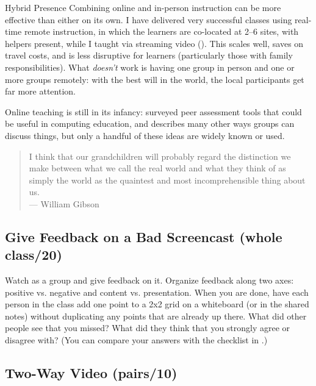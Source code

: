\begin{aside}{Hybrid Presence}
  Combining online and in-person instruction can be more effective than
  either on its own. I have delivered very successful classes using
  real-time remote instruction, in which the learners are co-located at
  2--6 sites, with helpers present, while I taught via streaming video
  (). This scales well, saves on travel
  costs, and is less disruptive for learners (particularly those with
  family responsibilities). What \emph{doesn't} work is having one group in
  person and one or more groups remotely: with the best will in the
  world, the local participants get far more attention.
\end{aside}

Online teaching is still in its infancy: \cite{Luxt2009} surveyed
peer assessment tools that could be useful in computing education, and
\cite{Broo2016} describes many other ways groups can discuss things,
but only a handful of these ideas are widely known or used.

\begin{quote}

  I think that our grandchildren will probably regard
  the distinction we make between what we call the real world
  and what they think of as simply the world
  as the quaintest and most incomprehensible thing about us. \\
  --- William Gibson

\end{quote}


\subsection*{Give Feedback on a Bad Screencast (whole class/20)}

Watch  as a group and give
feedback on it. Organize feedback along two axes: positive
vs. negative and content vs. presentation. When you are done, have
each person in the class add one point to a 2x2 grid on a whiteboard
(or in the shared notes) without duplicating any points that are
already up there. What did other people see that you missed? What did
they think that you strongly agree or disagree with? (You can compare
your answers with the checklist in .)

\subsection*{Two-Way Video (pairs/10)}

